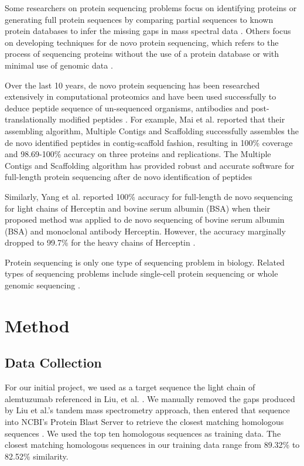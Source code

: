 \documentclass[journal]{IEEEtran}
\begin{document}
    Some researchers on protein sequencing problems focus on identifying proteins or generating full protein sequences
    by comparing partial sequences to known protein databases to infer the missing gaps in mass spectral data
    \cite{eng1994approach, perkins1999probability}. Others focus on developing techniques for de novo protein sequencing,
    which refers to the process of sequencing proteins without the use of a protein database or with minimal use of
    genomic data \cite{standing2003peptide, bandeira2008automated}.

    Over the last 10 years, de novo protein sequencing has been researched
    extensively in computational proteomics and have been used successfully to deduce peptide sequence
    of un-sequenced organisms, antibodies and post-translationally modified peptides
    \cite{ma2012novo,veltman2012novo, bandeira2007spectral}. For example,
    Mai et al. reported that their assembling algorithm, Multiple Contigs and Scaffolding
    successfully assembles the de novo identified peptides in contig-scaffold fashion, resulting in
    100\% coverage and 98.69-100\% accuracy on three proteins and replications. The Multiple Contigs
    and Scaffolding algorithm has provided robust and accurate software for full-length protein sequencing
    after de novo identification of peptides \cite{mai2022highly}

    Similarly, Yang et al. reported 100\% accuracy for full-length de novo sequencing
    for light chains of Herceptin and bovine serum albumin (BSA) when their proposed method was applied to de novo
    sequencing of bovine serum albumin (BSA) and monoclonal antibody Herceptin. However, the accuracy marginally dropped to
    99.7\% for the heavy chains of Herceptin \cite{yang2021full}.

    Protein sequencing is only one type of sequencing problem in biology. Related types of sequencing problems include
    single-cell protein sequencing or whole genomic sequencing \cite{wang2015advances,pareek2011sequencing}.

\section{Method}

  \subsection{Data Collection}
    For our initial project, we used as a target sequence the light chain of alemtuzumab referenced in Liu, et al.
    \cite{liu2014novo}. We manually removed the gaps produced by Liu et al.'s tandem mass spectrometry approach, then
    entered that sequence into NCBI's Protein Blast Server to retrieve the closest matching homologous sequences \cite{ncbi}.
    We used the top ten homologous sequences as training data. The closest matching homologous sequences in our training
    data range from 89.32\% to 82.52\% similarity.
\end{document}
